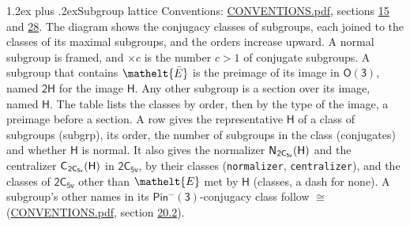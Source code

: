 \documentclass[10pt,a4paper]{article}
\makeatletter
\renewcommand\section{\@startsection{section}{1}{\z@}{-3ex plus -1ex minus -.2ex}%
  {1.2ex plus .2ex}{\normalfont\large\sffamily\bfseries\color{parttitle}}}
\numberwithin{equation}{section}
\newcommand{\eltfont}[1]{{\let\sigma\eltsigma\mathelt{#1}}}
\newcommand{\grp}[1]{\mathsf{#1}}
\newcommand{\cls}[1]{\eltfont{#1}}
\newcommand{\elt}[1]{\eltfont{#1}}
\newcommand{\samecls}{\cong}
\newcommand{\nconj}[1]{{\scriptsize$\times#1$}}
\newcommand{\barred}[1]{\bar{#1}}
\newcommand{\hairsp}{\mkern1mu}
\makeatother
\begin{document}
\section{Subgroup lattice}\label{s:subgroups}
Conventions: \href{../../CONVENTIONS.pdf}{CONVENTIONS.pdf}, sections \href{../../../rotation/CONVENTIONS.pdf\#conv.15}{15} and \href{../../CONVENTIONS.pdf\#conv.28}{28}.
The diagram shows the conjugacy classes of subgroups, each joined to the classes of its maximal subgroups, and the orders increase upward. A normal subgroup is framed, and ${\times}c$ is the number $c > 1$ of conjugate subgroups. \label{n:group.H}A subgroup that contains $\elt{\barred{E}}$ is the preimage of its image in $\grp{O(3)}$, named $\grp{2H}$ for the image $\grp{H}$. Any other subgroup is a section over its image, named $\grp{H}$. The table lists the classes by order, then by the type of the image, a preimage before a section. \label{n:head.subgroup}\label{n:head.order}\label{n:head.conjugates}\label{n:head.normal}A row gives the representative $\grp{H}$ of a class of subgroups (subgrp), its order, the number of subgroups in the class (conjugates) and whether $\grp{H}$ is normal. \label{n:group.normalizer}\label{n:group.centralizer}\label{n:head.classes}It also gives the normalizer $\grp{N}_{\hairsp \grp{2C_{5v}}}(\grp{H})$ and the centralizer $\grp{C}_{\hairsp \grp{2C_{5v}}}(\grp{H})$ in $\grp{2C_{5v}}$, by their classes (\texttt{normalizer}, \texttt{centralizer}), and the classes of $\grp{2C_{5v}}$ other than $\cls{E}$ met by $\grp{H}$ (classes, a dash for none). A subgroup's other names in its \href{Pinminus3.pdf}{$\grp{Pin^{-}(3)}$}-conjugacy class follow $\samecls$ (\href{../../CONVENTIONS.pdf}{CONVENTIONS.pdf}, section \href{../../CONVENTIONS.pdf\#conv.20.2}{20.2}).
\begin{center}
\end{center}
\end{document}
